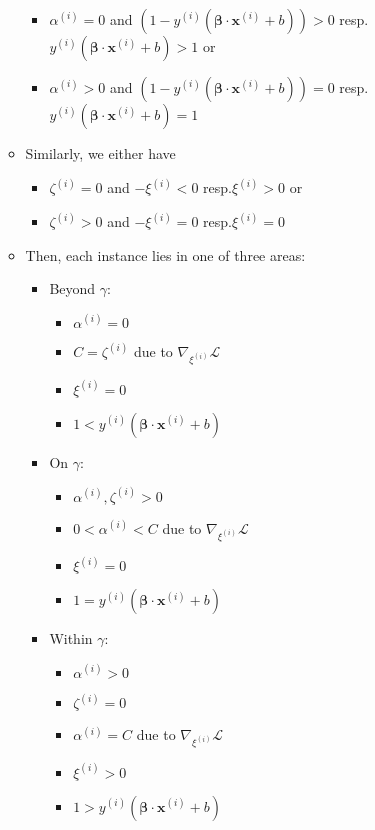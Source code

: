 \begin{itemize}
\begin{itemize}
        \begin{itemize}
            \item $\alpha^{(i)} = 0$ and $ (1 - y^{(i)} (\boldsymbol{\beta} \cdot \boldsymbol{x}^{(i)} + b)) > 0$ resp.$ y^{(i)} (\boldsymbol{\beta} \cdot \boldsymbol{x}^{(i)} + b) > 1$ or
            \item $\alpha^{(i)} > 0$ and $ (1 - y^{(i)} (\boldsymbol{\beta} \cdot \boldsymbol{x}^{(i)} + b)) = 0$ resp.$ y^{(i)} (\boldsymbol{\beta} \cdot \boldsymbol{x}^{(i)} + b) = 1$ 
        \end{itemize}
        \item Similarly, we either have
        \begin{itemize}
            \item $\zeta^{(i)} = 0$ and $ -\xi^{(i)} < 0$ resp.$ \xi^{(i)} > 0$ or
            \item $\zeta^{(i)} > 0$ and $ -\xi^{(i)} = 0$ resp.$ \xi^{(i)} = 0$
        \end{itemize}
        \item Then, each instance lies in one of three areas:
        \begin{itemize}
            \item Beyond $\gamma$:
            \begin{itemize}
                \item $\alpha^{(i)} = 0$
                \item $C = \zeta^{(i)}$ due to $\nabla_{\xi^{(i)}} \mathcal{L}$
                \item $\xi^{(i)} = 0$
                \item $1 < y^{(i)} (\boldsymbol{\beta} \cdot \boldsymbol{x}^{(i)} + b)$
            \end{itemize}
            \item On $\gamma$:
            \begin{itemize}
                \item $\alpha^{(i)}, \zeta^{(i)} > 0$
                \item $0 < \alpha^{(i)} < C$ due to $\nabla_{\xi^{(i)}} \mathcal{L}$
                \item $\xi^{(i)} = 0$
                \item $1 = y^{(i)} (\boldsymbol{\beta} \cdot \boldsymbol{x}^{(i)} + b)$
            \end{itemize}
            \item Within $\gamma$:
            \begin{itemize}
                \item $\alpha^{(i)} > 0$
                \item $\zeta^{(i)} = 0$
                \item $\alpha^{(i)} = C$ due to $\nabla_{\xi^{(i)}} \mathcal{L}$
                \item $\xi^{(i)} > 0$
                \item $1 > y^{(i)} (\boldsymbol{\beta} \cdot \boldsymbol{x}^{(i)} + b)$
            \end{itemize}
        \end{itemize}
    \end{itemize}
\end{itemize}

